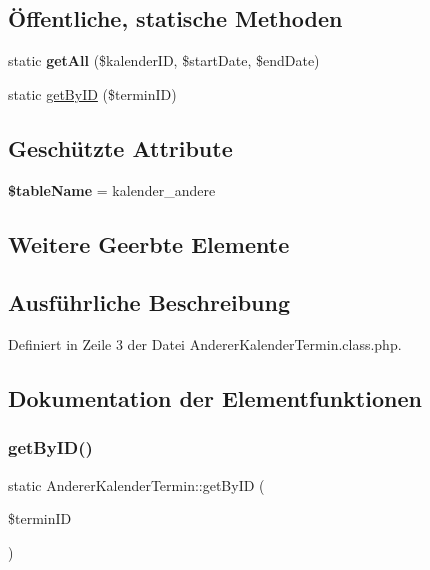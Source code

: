 \subsection*{Öffentliche, statische Methoden}
\begin{DoxyCompactItemize}
\item 
\mbox{\label{class_anderer_kalender_termin_ab52857e1703e8d326ae1d53c0640d6ef}} 
static {\bfseries get\+All} (\$kalender\+ID, \$start\+Date, \$end\+Date)
\item 
static \mbox{\hyperlink{class_anderer_kalender_termin_ad00ac75131988ff1d40534937a30cbca}{get\+By\+ID}} (\$termin\+ID)
\end{DoxyCompactItemize}
\subsection*{Geschützte Attribute}
\begin{DoxyCompactItemize}
\item 
\mbox{\label{class_anderer_kalender_termin_ad3bad4883ad524e1c56effb7f151a52c}} 
{\bfseries \$table\+Name} = \textquotesingle{}kalender\+\_\+andere\textquotesingle{}
\end{DoxyCompactItemize}
\subsection*{Weitere Geerbte Elemente}


\subsection{Ausführliche Beschreibung}


Definiert in Zeile 3 der Datei Anderer\+Kalender\+Termin.\+class.\+php.



\subsection{Dokumentation der Elementfunktionen}
\mbox{\label{class_anderer_kalender_termin_ad00ac75131988ff1d40534937a30cbca}} 
\subsubsection{\texorpdfstring{get\+By\+I\+D()}{getByID()}}
{\footnotesize\ttfamily static Anderer\+Kalender\+Termin\+::get\+By\+ID (\begin{DoxyParamCaption}\item[{}]{\$termin\+ID }\end{DoxyParamCaption})\hspace{0.3cm}{\ttfamily [static]}}


